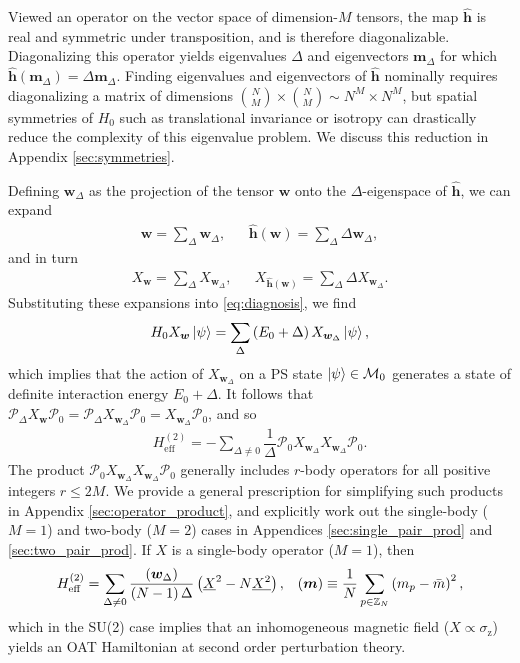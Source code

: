 \documentclass[nofootinbib,notitlepage,11pt]{revtex4-2}
\renewcommand{\t}{\text} %
\newcommand{\f}[2]{\dfrac{#1}{#2}} %
\newcommand{\p}[1]{\left(#1\right)} %
\newcommand{\m}{\bm} %
\newcommand{\1}{\mathds{1}}
\newcommand{\z}{\text{z}}
\newcommand{\M}{\mathcal{M}}
\renewcommand{\P}{\mathcal{P}}
\newcommand{\ZZ}{\mathbb{Z}}
\newcommand{\col}{\underline}
\let\var\relax
\DeclareMathOperator{\var}{var}
\begin{document}
Viewed an operator on the vector space of dimension-$M$ tensors, the
map $\hat{\m h}$ is real and symmetric under transposition, and is
therefore diagonalizable.  Diagonalizing this operator yields
eigenvalues $\Delta$ and eigenvectors $\m m_\Delta$ for which
$\hat{\m h}\p{\m m_\Delta}=\Delta\m m_\Delta$.  Finding eigenvalues
and eigenvectors of $\hat{\m h}$ nominally requires diagonalizing a
matrix of dimensions
${N\choose M}\times{N\choose M}\sim N^M\times N^M$, but spatial
symmetries of $H_0$ such as translational invariance or isotropy can
drastically reduce the complexity of this eigenvalue problem.  We
discuss this reduction in Appendix \ref{sec:symmetries}.

Defining $\m w_\Delta$ as the projection of the tensor $\m w$ onto the
$\Delta$-eigenspace of $\hat{\m h}$, we can expand
\begin{align}
  \m w = \sum_\Delta \m w_\Delta,
  &&
  \hat{\m h}\p{\m w} = \sum_\Delta \Delta \m w_\Delta,
\end{align}
and in turn
\begin{align}
  X_{\m w} = \sum_\Delta X_{\m w_\Delta},
  &&
  X_{\hat{\m h}\p{\m w}} = \sum_\Delta \Delta X_{\m w_\Delta}.
\end{align}
Substituting these expansions into \eqref{eq:diagnosis}, we find
\begin{align}
  H_0 X_{\m w} \ket\psi
  = \sum_\Delta\p{E_0 + \Delta} X_{\m w_\Delta} \ket\psi,
\end{align}
which implies that the action of $X_{\m w_\Delta}$ on a PS state
$\ket\psi\in\M_0$ generates a state of definite interaction energy
$E_0+\Delta$.  It follows that
$\P_\Delta X_{\m w} \P_0 = \P_\Delta X_{\m w_\Delta} \P_0 = X_{\m
  w_\Delta} \P_0$, and so
\begin{align}
  H_{\t{eff}}^{(2)} = -\sum_{\Delta\ne0}
  \f1\Delta \P_0 X_{\m w_\Delta} X_{\m w_\Delta} \P_0.
\end{align}
The product $\P_0 X_{\m w_\Delta} X_{\m w_\Delta} \P_0$ generally
includes $r$-body operators for all positive integers $r\le2M$.  We
provide a general prescription for simplifying such products in
Appendix \ref{sec:operator_product}, and explicitly work out the
single-body ($M=1$) and two-body ($M=2$) cases in Appendices
\ref{sec:single_pair_prod} and \ref{sec:two_pair_prod}.  If $X$ is a
single-body operator ($M=1$), then
\begin{align}
  H_{\t{eff}}^{(2)}
  = \sum_{\Delta\ne0} \f{\var\p{\m w_\Delta}}{\p{N-1}\Delta}
  \p{\col{X}^2 - N \col{X^2}},
  &&
  \var\p{\m m} \equiv \f1N \sum_{p\in\ZZ_N} \p{m_p-\bar m}^2,
\end{align}
which in the SU(2) case implies that an inhomogeneous magnetic field
($X\propto\sigma_\z$) yields an OAT Hamiltonian at second order
perturbation theory.
\end{document}
